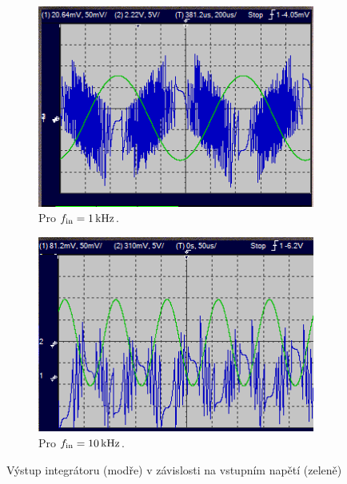 \documentclass[twoside]{article}
\begin{document}
\begin{figure}[h]
    \begin{subfigure}{0.45\textwidth}
        \includegraphics[width=\textwidth]{sin-1000Hz.png}
        \caption{Pro $f_{\rm in} = \SI{1}{\kilo\hertz}$.}
        \label{1000Hz}
    \end{subfigure}
    \begin{subfigure}{0.45\textwidth}
        \includegraphics[width=\textwidth]{sin-10000Hz.png}
    \caption{Pro $f_{\rm in} = \SI{10}{\kilo\hertz}$.}
    \label{10000Hz}
\end{subfigure}
\caption{Výstup integrátoru (modře) v závislosti na
vstupním napětí (zeleně)}
\label{harmonicke}
\end{figure}
\end{document}
